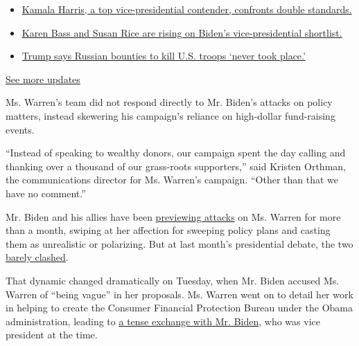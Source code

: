 \begin{itemize}
\tightlist
\item
  \href{https://www.nytimes.com/2020/07/31/us/elections/biden-vs-trump.html?action=click\&pgtype=Article\&state=default\&region=MAIN_CONTENT_1\&context=storylines_live_updates\#link-29fdff45}{Kamala
  Harris, a top vice-presidential contender, confronts double
  standards.}
\item
  \href{https://www.nytimes.com/2020/07/31/us/elections/biden-vs-trump.html?action=click\&pgtype=Article\&state=default\&region=MAIN_CONTENT_1\&context=storylines_live_updates\#link-13ec3d9c}{Karen
  Bass and Susan Rice are rising on Biden's vice-presidential
  shortlist.}
\item
  \href{https://www.nytimes.com/2020/07/31/us/elections/biden-vs-trump.html?action=click\&pgtype=Article\&state=default\&region=MAIN_CONTENT_1\&context=storylines_live_updates\#link-49e9a016}{Trump
  says Russian bounties to kill U.S. troops `never took place.'}
\end{itemize}

\href{https://www.nytimes.com/2020/07/31/us/elections/biden-vs-trump.html?action=click\&pgtype=Article\&state=default\&region=MAIN_CONTENT_1\&context=storylines_live_updates}{See
more updates}

Ms. Warren's team did not respond directly to Mr. Biden's attacks on
policy matters, instead skewering his campaign's reliance on high-dollar
fund-raising events.

``Instead of speaking to wealthy donors, our campaign spent the day
calling and thanking over a thousand of our grass-roots supporters,''
said Kristen Orthman, the communications director for Ms. Warren's
campaign. ``Other than that we have no comment.''

Mr. Biden and his allies have been
\href{https://www.nytimes.com/2019/09/11/us/politics/joe-biden-elizabeth-warren-debate.html}{previewing
attacks} on Ms. Warren for more than a month, swiping at her affection
for sweeping policy plans and casting them as unrealistic or polarizing.
But at last month's presidential debate, the two
\href{https://www.nytimes.com/2019/09/13/us/politics/joe-biden-elizabeth-warren-debate.html}{barely
clashed}.

That dynamic changed dramatically on Tuesday, when Mr. Biden accused Ms.
Warren of ``being vague'' in her proposals. Ms. Warren went on to detail
her work in helping to create the Consumer Financial Protection Bureau
under the Obama administration, leading to
\href{https://www.nytimes.com/2019/10/15/us/politics/biden-warren-debate.html}{a
tense exchange with Mr. Biden}, who was vice president at the time.


